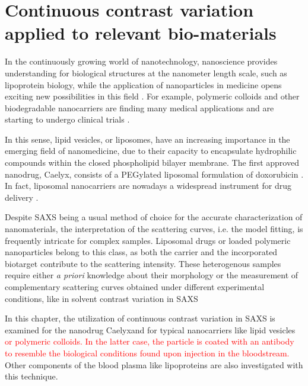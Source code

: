 \chapter{Continuous contrast variation applied to relevant bio-materials}
\label{chap:bio_applications}

In the continuously growing world of nanotechnology, nanoscience provides understanding for biological structures at the nanometer length scale, such as lipoprotein biology, while the application of nanoparticles in medicine opens exciting new possibilities in this field \citep{nie_nanotechnology_2007, sahoo_nanotech_2003, wickline_nanotechnology_2003, zhou_nano-enabled_2014, rosen_rise_2005}. For example, polymeric colloids and other biodegradable nanocarriers are finding many medical applications \citep{vicent_polymer_2006} and are starting to undergo clinical trials \citep{patel_polymeric_2012,beija_colloidal_2012,cabral_progress_2014}. 

In this sense, lipid vesicles, or liposomes, have an increasing importance in the emerging field of nanomedicine, due to their capacity to encapsulate hydrophilic compounds within the closed phospholipid bilayer membrane. The first approved nanodrug, Caelyx\textregistered, consists of a PEGylated liposomal formulation of doxorubicin \citep{barenholz_doxil_2012}. In fact, liposomal nanocarriers are nowadays a widespread instrument for drug delivery \citep{perez-herrero_advanced_2015}.

Despite SAXS being a usual method of choice for the accurate characterization of nanomaterials, the interpretation of the scattering curves, i.e. the model fitting, is frequently intricate for complex samples. Liposomal drugs or loaded polymeric nanoparticles belong to this class, as both the carrier and the incorporated biotarget contribute to the scattering intensity. These heterogenous samples require either \emph{a priori} knowledge about their morphology or the measurement of complementary scattering curves obtained under different experimental conditions, like in solvent contrast variation in SAXS 

In this chapter, the utilization of continuous contrast variation in SAXS is examined for the nanodrug Caelyx\textregistered and for typical nanocarriers like lipid vesicles \textcolor{red}{or polymeric colloids. In the latter case, the particle is coated with an antibody to resemble the biological conditions found upon injection in the bloodstream.} Other components of the blood plasma like lipoproteins are also investigated with this technique.

